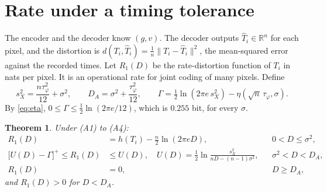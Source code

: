 \documentclass[10pt]{article}
\newtheorem{theorem}{Theorem}
\theoremstyle{remark}
\newcommand{\tphi}{\tau_\varphi}
\begin{document}
\section{Rate under a timing tolerance}
The encoder and the decoder know $(g,v)$. The decoder outputs $\hat T_i\in\mathbb R^n$ for each
pixel, and the distortion is $d(T_i,\hat T_i)=\tfrac1n\|T_i-\hat T_i\|^2$, the mean-squared error
against the recorded times. Let $R_1(D)$ be the rate-distortion function of $T_i$ in nats per
pixel. It is an operational rate for joint coding of many pixels. Define
\begin{equation}\label{eq:defs}
  s_X^2=\frac{n\tphi^2}{12}+\sigma^2,\qquad D_A=\sigma^2+\frac{\tphi^2}{12},\qquad
  \Gamma=\tfrac12\ln(2\pi e\,s_X^2)-\eta(\sqrt n\,\tphi,\sigma).
\end{equation}
By \eqref{eq:eta}, $0\le\Gamma\le\tfrac12\ln(2\pi e/12)$, which is $0.255$ bit, for every $\sigma$.
\begin{theorem}\label{thm:rd}
Under (A1) to (A4):
\begin{align}
  R_1(D)&=h(T_i)-\frac n2\ln(2\pi eD), && 0<D\le\sigma^2, \label{eq:rdlow}\\
  \big[U(D)-\Gamma\big]^+\le R_1(D)&\le U(D),\quad U(D)=\frac12\ln\frac{s_X^2}{nD-(n-1)\sigma^2}, && \sigma^2<D<D_A, \label{eq:rdmid}\\
  R_1(D)&=0, && D\ge D_A, \label{eq:rdzero}
\end{align}
and $R_1(D)>0$ for $D<D_A$.
\end{theorem}
\end{document}
